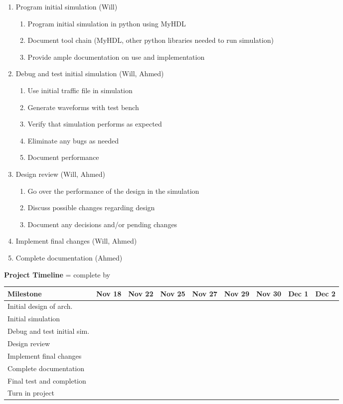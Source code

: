 \documentclass[12pt]{article}
\begin{document}
\begin{description}
\begin{enumerate}
			\item Program initial simulation (Will)
			\begin{enumerate}
				\item Program initial simulation in python using MyHDL
				\item Document tool chain (MyHDL, other python libraries needed to run simulation)
				\item Provide ample documentation on use and implementation
			\end{enumerate}
			\item Debug and test initial simulation (Will, Ahmed)
			\begin{enumerate}
				\item Use initial traffic file in simulation
				\item Generate waveforms with test bench
				\item Verify that simulation performs as expected
				\item Eliminate any bugs as needed
				\item Document performance
			\end{enumerate}
			\item Design review (Will, Ahmed)
			\begin{enumerate}
				\item Go over the performance of the design in the simulation
				\item Discuss possible changes regarding design
				\item Document any decisions and/or pending changes
			\end{enumerate}
			\item Implement final changes (Will, Ahmed)
			\item Complete documentation (Ahmed)
		\end{enumerate}
		\textbf{Project Timeline}
		\checkmark = complete by
		\tabcolsep=0.11cm
		\begin{table}[h!]
 			\begin{tabulary}{1.3\textwidth}{|L|L|L|L|L|L|L|L|L|}
 			\hline
 			 Milestone & Nov 18 & Nov 22  & Nov 25 & Nov 27 & Nov 29 & Nov 30 & Dec 1 & Dec 2\\ %
 			\hline
 			Initial design of arch. & \checkmark &  &  & & & & &\\ 
			\hline
			Initial simulation &  & \checkmark &  &  & & & &\\ 
			\hline
			Debug and test initial sim. &  &  & \checkmark &  & & & &\\ 
			\hline
			Design review &  &  &  & \checkmark & & & &\\ 
			\hline
			Implement final changes &  &  &  & & \checkmark & & &\\ 
			\hline
			Complete documentation &  &  &  &  & & \checkmark & &\\
			\hline
			Final test and completion &  &  &  &  & & & \checkmark &\\
			\hline
			Turn in project &  &  &  &  & & & &\checkmark \\
			\hline
 			\end{tabulary}
			\end{table}
			
\end{description}
\end{document}
